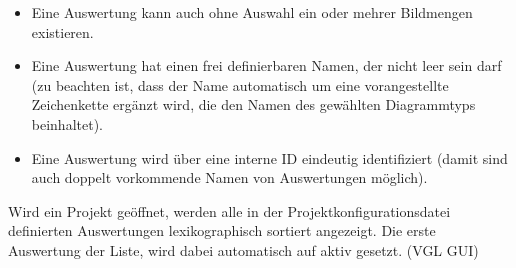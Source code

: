 	\begin{itemize}

		\item Eine Auswertung kann auch ohne Auswahl ein oder mehrer Bildmengen existieren. 

		\item Eine Auswertung hat einen frei definierbaren Namen, der nicht leer sein darf (zu beachten ist, dass der Name automatisch um eine vorangestellte Zeichenkette ergänzt wird, die den Namen des gewählten Diagrammtyps beinhaltet).

		\item Eine Auswertung wird über eine interne ID eindeutig identifiziert (damit sind auch doppelt vorkommende Namen von Auswertungen möglich).

	\end{itemize}

	Wird ein Projekt geöffnet, werden alle in der Projektkonfigurationsdatei definierten Auswertungen lexikographisch sortiert angezeigt. Die erste Auswertung der Liste, wird dabei automatisch auf aktiv gesetzt. (VGL GUI)

